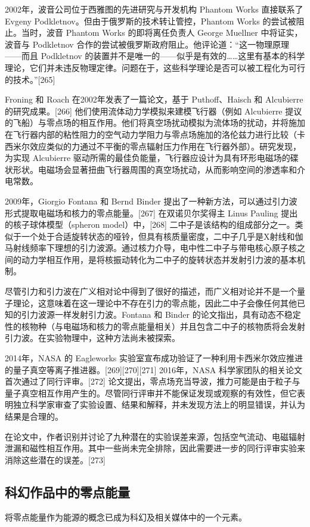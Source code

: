 2002年，波音公司位于西雅图的先进研究与开发机构 Phantom Works 直接联系了 Evgeny Podkletnov。但由于俄罗斯的技术转让管控，Phantom Works 的尝试被阻止。当时，波音 Phantom Works 的即将离任负责人 George Muellner 中将证实，波音与 Podkletnov 合作的尝试被俄罗斯政府阻止。他评论道：“这一物理原理——而且 Podkletnov 的装置并不是唯一的——似乎是有效的……这里有基本的科学理论，它们并未违反物理定律。问题在于，这些科学理论是否可以被工程化为可行的技术。”[265]  

Froning 和 Roach 在2002年发表了一篇论文，基于 Puthoff、Haisch 和 Alcubierre 的研究成果。[266] 他们使用流体动力学模拟来建模飞行器（例如 Alcubierre 提议的飞船）与零点场的相互作用。他们将真空场扰动模拟为流体场的扰动，并将施加在飞行器内部的粘性阻力的空气动力学阻力与零点场施加的洛伦兹力进行比较（卡西米尔效应类似的力通过不平衡的零点辐射压力作用在飞行器外部）。研究发现，为实现 Alcubierre 驱动所需的最佳负能量，飞行器应设计为具有环形电磁场的碟状形状。电磁场会显著扭曲飞行器周围的真空场扰动，从而影响空间的渗透率和介电常数。  

2009年，Giorgio Fontana 和 Bernd Binder 提出了一种新方法，可以通过引力波形式提取电磁场和核力的零点能量。[267] 在双诺贝尔奖得主 Linus Pauling 提出的核子球体模型（spheron model）中，[268] 二中子是该结构的组成部分之一。类似于一个处于合适旋转状态的哑铃，但具有核质量密度，二中子几乎是X射线和伽马射线频率下理想的引力波源。通过核力介导，电中性二中子与带电核心原子核之间的动力学相互作用，是将核振动转化为二中子的旋转状态并发射引力波的基本机制。  

尽管引力和引力波在广义相对论中得到了很好的描述，而广义相对论并不是一个量子理论，这意味着在这一理论中不存在引力的零点能，因此二中子会像任何其他已知的引力波源一样发射引力波。Fontana 和 Binder 的论文指出，具有动态不稳定性的核物种（与电磁场和核力的零点能量相关）并且包含二中子的核物质将会发射引力波。在实验物理中，这种方法尚未被探索。  

2014年，NASA 的 Eagleworks 实验室宣布成功验证了一种利用卡西米尔效应推进的量子真空等离子推进器。[269][270][271] 2016年，NASA 科学家团队的相关论文首次通过了同行评审。[272] 论文提出，零点场充当导波，推力可能是由于粒子与量子真空相互作用产生的。尽管同行评审并不能保证发现或观察的有效性，但它表明独立科学家审查了实验设置、结果和解释，并未发现方法上的明显错误，并认为结果是合理的。  

在论文中，作者识别并讨论了九种潜在的实验误差来源，包括空气流动、电磁辐射泄漏和磁性相互作用。其中一些尚未完全排除，因此需要进一步的同行评审实验来消除这些潜在的误差。[273]  
\subsection{科幻作品中的零点能量} 
将零点能量作为能源的概念已成为科幻及相关媒体中的一个元素。
